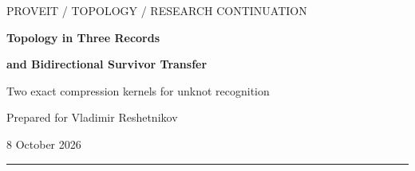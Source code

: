 \documentclass[11pt,letterpaper]{article}
\theoremstyle{definition}
\theoremstyle{remark}
\begin{document}
\hypersetup{pageanchor=false}
\begin{titlepage}
\vspace*{0.6in}
{\large\color{accent}\sffamily PROVEIT / TOPOLOGY / RESEARCH CONTINUATION\par}
\vspace{0.32in}
{\Huge\bfseries\color{ink}Topology in Three Records\par}
\vspace{0.1in}
{\LARGE\bfseries\color{ink}and Bidirectional Survivor Transfer\par}
\vspace{0.27in}
{\Large Two exact compression kernels for unknot recognition\par}
\vspace{0.4in}
{\large Prepared for Vladimir Reshetnikov\par}
{\large 8 October 2026\par}
\vspace{0.35in}
\noindent\textcolor{accent}{\rule{\textwidth}{1.2pt}}
\vspace{0.2in}
\begin{abstract}
We develop two exact compression results motivated by the current
\emph{ProveIt} unknot-recognition implementation. First, a finite covering
of a connected bordered surface whose fibre monodromy has the form
$x\mapsto\pm x+a\pmod W$ has at most three families of connected
components, isomorphic as covers within each family. We give explicit
formulas for their multiplicities, orientability, genera, and every
boundary covering degree; the bound is sharp even for orientable bases.
The arithmetic depends polynomially on $\log W$ and supports marked
component and boundary queries without expanding the sheets.

Second, we express a quantum-graded scalar contraction's transferred
differential as a typed acyclic path sum. We prove that only paths between
surviving objects need be retained, and that each resulting component may
be evaluated from either end. This gives exact direction-sensitive work
bounds and graded families with quadratic versus linear transfer work.
A further implementation contracts the scalar graph component by
component and uses sparse index columns, avoiding artificial quadratic
bit storage on disconnected scalar blocks. Combined with Boolean
reachability, it gives a complete near-linear reduction stage on a fixed
coefficient algebra where inherited forward transfer alone takes
quadratic work.


\end{abstract}
\end{titlepage}
\end{document}
